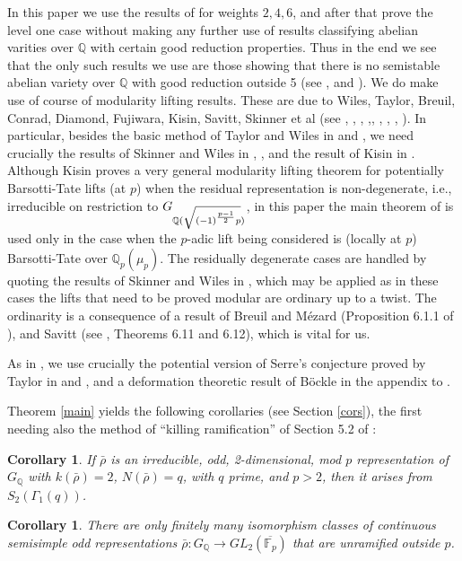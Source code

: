 \documentclass[12pt]{amsart}
\newcommand{\Q}{\mathbb{Q}}
\newcommand{\aFp}{\overline{\mathbb{F}_{p}}}
\newcommand{\rhobar}{\overline{\rho}}
\newtheorem{cor}[theorem]{Corollary}
\def\rhobar{ {\bar {\rho} } }
\def\rhob{ {\bar {\rho} } }
\begin{document}
In this paper we use the results of \cite{KW} for weights $2,4,6$, and after that prove the level
one case without making any further use of results classifying abelian varities
over $\Q$ with certain good reduction properties. Thus in the end we see that the
only such results we use are those showing that there is no semistable
abelian variety
over $\Q$ with good reduction outside 5 (see \cite{Fontaine}, \cite{Schoof1} and \cite{BK}). 
We do make use of course of modularity lifting results. These are 
due to Wiles, Taylor, Breuil, Conrad, Diamond, Fujiwara, Kisin, Savitt, Skinner et al
(see \cite{Wiles}, \cite{TW},  
\cite{Fujiwara}, \cite{CDT},\cite{BCDT}, \cite{SW2}, \cite{SW3}, \cite{Savitt}, \cite{Kisin}). In particular, besides the basic method 
of Taylor and Wiles in \cite{Wiles} and \cite{TW}, we need crucially the results of Skinner and Wiles in \cite{SW2},
\cite{SW3}, and the result of Kisin in \cite{Kisin}.  Although Kisin proves a very general modularity lifting theorem for potentially Barsotti-Tate lifts (at $p$) when the residual representation is non-degenerate, i.e.,  
irreducible on restriction to $G_{\Q(\sqrt{{ (-1)}^{p-1 \over 2}p})}$, in this paper the main theorem of \cite{Kisin} is used only in the 
case when the $p$-adic lift being considered is (locally at $p$) Barsotti-Tate over $\Q_p(\mu_p)$. The residually degenerate cases are handled by quoting the results of Skinner and Wiles in \cite{SW2}, \cite{SW3} which may be applied as in these cases the lifts that need to be proved modular are ordinary up to a twist. The ordinarity is  a consequence of a  result
of Breuil and M\'ezard (Proposition 6.1.1 of \cite{BM}), and Savitt (see \cite{Savitt1}, Theorems 6.11 and 6.12), which is vital for us. 

As in \cite{KW}, we use crucially the
potential version of Serre's conjecture proved by Taylor in \cite{Tay1} and \cite{Tay2}, and a deformation theoretic result of B\"ockle in the appendix to \cite{[K03]}.

Theorem \ref{main} yields the following corollaries (see Section \ref{cors}),
the first needing also the method of ``killing ramification'' of Section 5.2 of \cite{KW}:

\begin{cor}\label{cond}
  If $\rhob$ is  an irreducible, odd, 2-dimensional, mod $p$ representation of $G_\Q$ with $k(\rhobar)=2$, 
  $N(\rhobar)=q$, with $q$ prime, and $p>2$, then
  it arises from $S_2(\Gamma_1(q))$.
\end{cor}

\begin{cor}\label{finite}
 There are only finitely many isomorphism classes of continuous semisimple
 odd representations $\rhob:G_\Q \rightarrow GL_2(\aFp)$
 that are unramified outside $p$.
\end{cor}
\end{document}
